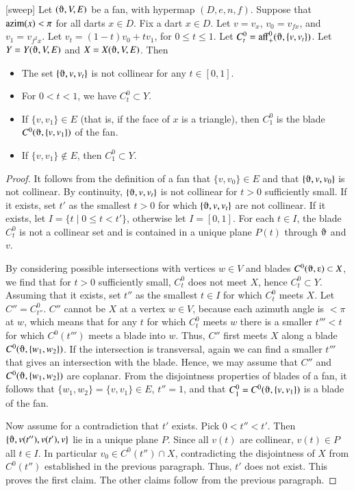 \begin{lemma}[sweep]\label{lemma:sweep}  
Let $(\orgn,V,E)$ be a fan, with hypermap $(D,e,n,f)$.  
Suppose that ${\operatorname{azim}}(x)<\pi$
for all darts $x\in D$.  Fix a dart $x\in D$.
Let $v = v_x$, $v_0 = v_{f x}$,
and $v_1 = v_{f^2 x}$.  Let $v_t = (1-t) v_0 + t v_1$, for
$0\le t\le 1$.  Let $C_t^0 = \op{aff}_+^0(\orgn,\{v,v_t\})$.
Let $Y = Y(\orgn,V,E)$ and $X = X(\orgn,V,E)$.
Then
\begin{itemize}
\item The set $\{\orgn,v,v_t\}$ is not collinear for any $t\in[0,1]$.
\item For $0< t < 1$, we have $C_t^0\subset Y$.
\item If $\{v,v_1\}\in E$ (that is, if the face of $x$ is a triangle), 
then $C_1^0$ is the blade $C^0(\orgn,\{v,v_1\})$ of the fan.
\item If $\{v,v_1\}\not\in E$, then $C_1^0\subset Y$.
\end{itemize}
\end{lemma}

\begin{proof}
It follows from the definition of a fan that $\{v,v_0\}\in E$ and
that $\{\orgn,v,v_0\}$ is not collinear.  By continuity, $\{\orgn,v,v_t\}$
is not collinear for $t>0$ sufficiently small.  If it exists, set $t'$ as
the smallest $t>0$ for which $\{\orgn,v,v_t\}$ are not collinear.  If it exists,
let $I=\{t\mid 0\le t < t'\}$, otherwise let $I=[0,1]$.  For
each $t\in I$, the blade $C_t^0$ is not a collinear set and is contained in a unique plane $P(t)$ through $\orgn$ and $v$.

By considering possible intersections with vertices $w\in V$ and blades
$C^0(\orgn,\e)\subset X$, we find that for $t>0$ sufficiently small,
$C^0_t$ does not meet $X$, hence $C^0_t\subset Y$.  Assuming 
that it exists, set $t''$
as the smallest $t\in I$ for which $C^0_t$ meets $X$.   Let $C'' = C_{t''}^0$.
$C''$ cannot be $X$ at a vertex $w\in V$, because each azimuth angle
is $<\pi$ at $w$, which means that for any $t$ for which  $C^0_t$ meets $w$ 
there is a smaller $t'''<t$ for which $C^0(t''')$ meets a blade into $w$.
Thus, $C''$ first meets $X$ along a blade $C^0(\orgn,\{w_1,w_2\})$. If
the intersection is transversal, again we can find a smaller $t'''$ that
gives an intersection with the blade.  Hence, we may assume that
$C''$ and $C^0(\orgn,\{w_1,w_2\})$ are coplanar.  From the disjointness
properties of blades of a fan, it follows that $\{w_1,w_2\} = \{v,v_1\}\in E$,
$t''=1$,
and that $C_1^0=C^0(\orgn,\{v,v_1\})$ is a blade of the fan.

Now assume for a contradiction that $t'$ exists.  Pick $0<t''<t'$.  Then
$\{\orgn,v(t''),v(t'),v\}$ lie in a unique plane $P$.  Since all $v(t)$
are collinear,  $v(t)\in P$ all $t\in I$.  In particular $v_0\in C^0(t'')\cap X$,
contradicting the disjointness of $X$ from $C^0(t'')$ established in
the previous paragraph.  Thus, $t'$ does not exist.  This proves the first
claim.  The other claims follow from the previous paragraph.
\end{proof}

